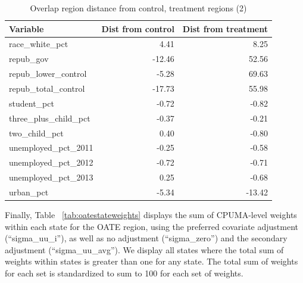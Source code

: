 \documentclass[12pt]{article}
\begin{document}
\begin{table}[ht]
\centering
\begin{tabular}{lrr}
  \toprule
Variable & Dist from control & Dist from treatment \\ 
  \midrule
  race\_white\_pct & 4.41 & 8.25 \\ 
  repub\_gov & -12.46 & 52.56 \\ 
  repub\_lower\_control & -5.28 & 69.63 \\ 
  repub\_total\_control & -17.73 & 55.98 \\ 
  student\_pct & -0.72 & -0.82 \\ 
  three\_plus\_child\_pct & -0.37 & -0.21 \\ 
  two\_child\_pct & 0.40 & -0.80 \\ 
  unemployed\_pct\_2011 & -0.25 & -0.58 \\ 
  unemployed\_pct\_2012 & -0.72 & -0.71 \\ 
  unemployed\_pct\_2013 & 0.25 & -0.68 \\ 
  urban\_pct & -5.34 & -13.42 \\ 
   \bottomrule
\end{tabular}
    \caption{Overlap region distance from control, treatment regions (2)}
    \label{tab:oatedist2}
\end{table}

Finally, Table ~\ref{tab:oatestateweights} displays the sum of CPUMA-level weights within each state for the OATE region, using the preferred covariate adjustment (``sigma\_uu\_i''), as well as no adjustment (``sigma\_zero'') and the secondary adjustment (``sigma\_uu\_avg''). We display all states where the total sum of weights within states is greater than one for any state. The total sum of weights for each set is standardized to sum to 100 for each set of weights.
\end{document}
